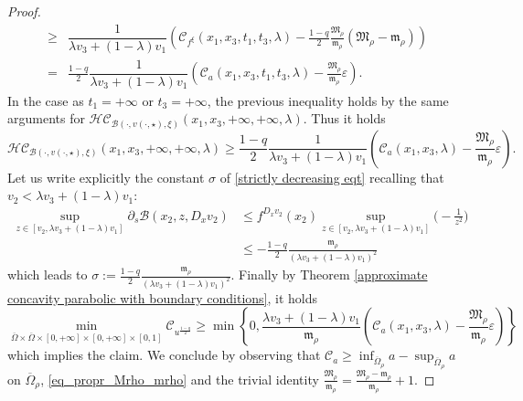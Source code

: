 \documentclass[11pt, reqno]{amsart}
\theoremstyle{definition}
\numberwithin{equation}{section}
\newcommand{\Omegabar}{\overline{\Omega}}
\begin{document}
\begin{proof}
\begin{align*}
			\geq & \dfrac{1}{\lambda v_3 +(1-\lambda)v_1} \left(\mathcal{C}_{f^{\xi}}(x_1,x_3,t_1,t_3,\lambda)-\frac{1-q}{2}\frac{ \mathfrak{M}_{\rho} }{ \mathfrak{m}_{\rho} }( \mathfrak{M}_{\rho} - \mathfrak{m}_{\rho} )\right)\\
			= & \frac{1-q}{2}\dfrac{1}{\lambda v_3 +(1-\lambda)v_1} \left(\mathcal{C}_{a}(x_1,x_3,t_1,t_3,\lambda)-\frac{ \mathfrak{M}_{\rho} }{ \mathfrak{m}_{\rho} }\varepsilon\right).
	\end{align*}
	In the case as $t_1=+\infty$ or $t_3=+\infty$, the previous inequality holds by the same arguments for $\mathcal{HC}_{\mathscr{B}(\cdot,v(\cdot,\star),\xi)}(x_1,x_3,+\infty,+\infty,\lambda)$. 
	Thus it holds
	\[ \mathcal{HC}_{\mathscr{B}(\cdot,v(\cdot,\star),\xi)}(x_1,x_3,+\infty, +\infty,\lambda) 
	\geq 
	\frac{1-q}{2} \frac{1}{\lambda v_3 +(1-\lambda)v_1} \left(\mathcal{C}_{a}(x_1,x_3,\lambda)-\frac{ \mathfrak{M}_{\rho} }{ \mathfrak{m}_{\rho} }\varepsilon\right).\]
	Let us write explicitly the constant $\sigma$ of \eqref{strictly decreasing eqt} recalling that $ v_2 < \lambda v_3 +(1-\lambda)v_1$:
	\begin{align*}
		\sup_{z\in [ v_2 ,\lambda v_3 +(1-\lambda)v_1]} \partial_s\mathscr{B}(x_2,z,D_x v_2 ) & \leq f^{D_x v_2 }(x_2) 	\sup_{z\in [ v_2 ,\lambda v_3 +(1-\lambda)v_1]}\bigg(-\frac{1}{z^2}\bigg)
		\\&
		\leq -\frac{1-q}{2}\frac{ \mathfrak{m}_{\rho} }{(\lambda v_3 +(1-\lambda)v_1)^2}
	\end{align*}
	which leads to $\sigma:=\frac{1-q}{2}\frac{ \mathfrak{m}_{\rho} }{(\lambda v_3 +(1-\lambda)v_1)^2}$. 
	Finally by Theorem \ref{approximate concavity parabolic with boundary conditions}, it holds
$$\min_{\Omegabar\times \Omegabar\times[0,+\infty]\times [0,+\infty]\times[0,1]}\mathcal{C}_{u^{\frac{1-q}{2}}}\geq 
\min	\left\{0,\frac{\lambda v_3 +(1-\lambda)v_1}{ \mathfrak{m}_{\rho} } \left(\mathcal{C}_{a}(x_1,x_3,\lambda)-\frac{ \mathfrak{M}_{\rho} }{ \mathfrak{m}_{\rho} }\varepsilon\right)\right\}$$
	which implies the claim.
We conclude by observing that $\mathcal{C}_{a} \geq \inf_{\Omegabar_\rho} a - \sup_{\Omegabar_\rho} a$ on $\Omegabar_{\rho}$, \eqref{eq_propr_Mrho_mrho} and the trivial identity $\frac{ \mathfrak{M}_{\rho} }{ \mathfrak{m}_{\rho}} = \frac{ \mathfrak{M}_{\rho} - \mathfrak{m}_{\rho} }{ \mathfrak{m}_{\rho}} +1$.
\end{proof}
\end{document}
